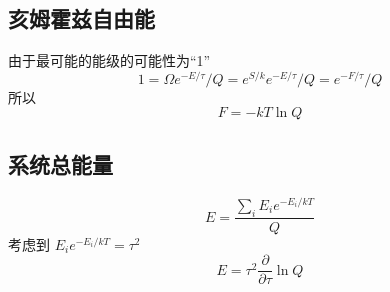 
\subsection{亥姆霍兹自由能}
由于最可能的能级的可能性为“1”
\begin{equation}
1 = \Omega {e^{ - E/\tau }}/Q = {e^{S/k}}{e^{ - E/\tau }}/Q = {e^{ - F/\tau }}/Q
\end{equation}
所以
\begin{equation}
F = -kT\ln Q
\end{equation}

\subsection{系统总能量}
\begin{equation}
E = \frac{\sum_i E_i e^{-E_i/kT}}{Q}
\end{equation}
考虑到 $E_i e^{-E_i/kT} = \tau^2$ %
\begin{equation}
E = {\tau ^2}\frac{\partial }{{\partial \tau }}\ln Q
\end{equation}